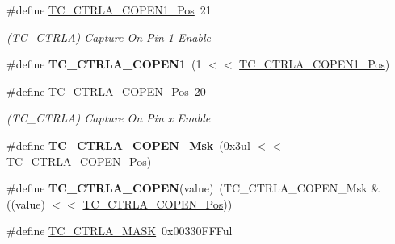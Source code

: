 \begin{DoxyCompactItemize}
\item 
\hypertarget{group___s_a_m_l21___t_c_ga78ab20d3cb590bf28aaedc40bf1cbbfc}{}\#define \hyperlink{group___s_a_m_l21___t_c_ga78ab20d3cb590bf28aaedc40bf1cbbfc}{T\+C\+\_\+\+C\+T\+R\+L\+A\+\_\+\+C\+O\+P\+E\+N1\+\_\+\+Pos}~21\label{group___s_a_m_l21___t_c_ga78ab20d3cb590bf28aaedc40bf1cbbfc}

\begin{DoxyCompactList}\small\item\em (T\+C\+\_\+\+C\+T\+R\+L\+A) Capture On Pin 1 Enable \end{DoxyCompactList}\item 
\hypertarget{group___s_a_m_l21___t_c_ga54825f0f3e10a0de5e1bec9ae94c8b08}{}\#define {\bfseries T\+C\+\_\+\+C\+T\+R\+L\+A\+\_\+\+C\+O\+P\+E\+N1}~(1 $<$$<$ \hyperlink{group___s_a_m_l21___t_c_ga78ab20d3cb590bf28aaedc40bf1cbbfc}{T\+C\+\_\+\+C\+T\+R\+L\+A\+\_\+\+C\+O\+P\+E\+N1\+\_\+\+Pos})\label{group___s_a_m_l21___t_c_ga54825f0f3e10a0de5e1bec9ae94c8b08}

\item 
\hypertarget{group___s_a_m_l21___t_c_gac01cc233b83e49ae7e73d68cdda015d6}{}\#define \hyperlink{group___s_a_m_l21___t_c_gac01cc233b83e49ae7e73d68cdda015d6}{T\+C\+\_\+\+C\+T\+R\+L\+A\+\_\+\+C\+O\+P\+E\+N\+\_\+\+Pos}~20\label{group___s_a_m_l21___t_c_gac01cc233b83e49ae7e73d68cdda015d6}

\begin{DoxyCompactList}\small\item\em (T\+C\+\_\+\+C\+T\+R\+L\+A) Capture On Pin x Enable \end{DoxyCompactList}\item 
\hypertarget{group___s_a_m_l21___t_c_ga921595d901d985dd82ba0f0f2d213ae6}{}\#define {\bfseries T\+C\+\_\+\+C\+T\+R\+L\+A\+\_\+\+C\+O\+P\+E\+N\+\_\+\+Msk}~(0x3ul $<$$<$ T\+C\+\_\+\+C\+T\+R\+L\+A\+\_\+\+C\+O\+P\+E\+N\+\_\+\+Pos)\label{group___s_a_m_l21___t_c_ga921595d901d985dd82ba0f0f2d213ae6}

\item 
\hypertarget{group___s_a_m_l21___t_c_gaafbdbf802b247c26b12ad25fbd746088}{}\#define {\bfseries T\+C\+\_\+\+C\+T\+R\+L\+A\+\_\+\+C\+O\+P\+E\+N}(value)~(T\+C\+\_\+\+C\+T\+R\+L\+A\+\_\+\+C\+O\+P\+E\+N\+\_\+\+Msk \& ((value) $<$$<$ \hyperlink{group___s_a_m_l21___t_c_gac01cc233b83e49ae7e73d68cdda015d6}{T\+C\+\_\+\+C\+T\+R\+L\+A\+\_\+\+C\+O\+P\+E\+N\+\_\+\+Pos}))\label{group___s_a_m_l21___t_c_gaafbdbf802b247c26b12ad25fbd746088}

\item 
\hypertarget{group___s_a_m_l21___t_c_gae815d015ba280a116263c65a59d68d85}{}\#define \hyperlink{group___s_a_m_l21___t_c_gae815d015ba280a116263c65a59d68d85}{T\+C\+\_\+\+C\+T\+R\+L\+A\+\_\+\+M\+A\+S\+K}~0x00330\+F\+F\+Ful\label{group___s_a_m_l21___t_c_gae815d015ba280a116263c65a59d68d85}


\end{DoxyCompactItemize}
